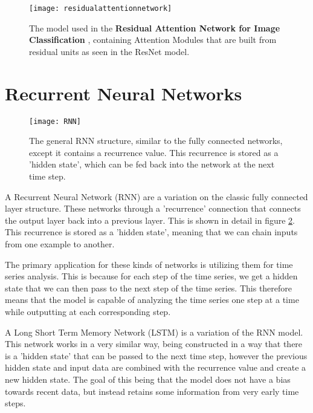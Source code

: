 \begin{figure}[ht]
	\texttt{[image: residualattentionnetwork]}
	\centering
	\caption{The model used in the \textbf{Residual Attention Network for Image Classification} \cite{residualattentionnetwork}, containing Attention Modules that are built from residual units as seen in the ResNet \cite{resnet} model.}
	\label{fig:residualattentionnetwork}
\end{figure}

\section{Recurrent Neural Networks}

\begin{figure}[ht]
	\texttt{[image: RNN]}
	\centering
	\caption{The general RNN structure, similar to the fully connected networks, except it contains a recurrence value. This recurrence is stored as a 'hidden state', which can be fed back into the network at the next time step.}
	\label{fig:rnn}
\end{figure}

A Recurrent Neural Network (RNN) are a variation on the classic fully connected layer structure. These networks through a 'recurrence' connection that connects the output layer back into a previous layer. This is shown in detail in figure \ref{fig:rnn}. This recurrence is stored as a 'hidden state', meaning that we can chain inputs from one example to another.

The primary application for these kinds of networks is utilizing them for time series analysis. This is because for each step of the time series, we get a hidden state that we can then pass to the next step of the time series. This therefore means that the model is capable of analyzing the time series one step at a time while outputting at each corresponding step.

A Long Short Term Memory Network (LSTM) is a variation of the RNN model. This network works in a very similar way, being constructed in a way that there is a 'hidden state' that can be passed to the next time step, however the previous hidden state and input data are combined with the recurrence value and create a new hidden state. The goal of this being that the model does not have a bias towards recent data, but instead retains some information from very early time steps.

